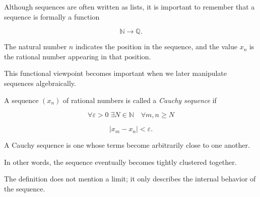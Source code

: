 
\begin{remark}
\label{rem:sequence-teacher}

Although sequences are often written as lists, it is important to
remember that a sequence is formally a function

\[
\mathbb{N} \to \mathbb{Q}.
\]

The natural number $n$ indicates the position in the sequence, and the
value $x_n$ is the rational number appearing in that position.

This functional viewpoint becomes important when we later manipulate
sequences algebraically.

\end{remark}


\begin{definition}
\label{def:cauchy-rational}

A sequence $(x_n)$ of rational numbers is called a
\emph{Cauchy sequence} if

\[
\forall \varepsilon > 0 \;
\exists N \in \mathbb{N}
\quad
\forall m,n \ge N
\]

\[
|x_m - x_n| < \varepsilon.
\]

\end{definition}


\begin{remark}[Intuition]
\label{rem:cauchy-intuition}

A Cauchy sequence is one whose terms become arbitrarily close to one
another.

In other words, the sequence eventually becomes tightly clustered
together.

The definition does not mention a limit; it only describes the
internal behavior of the sequence.

\end{remark}


